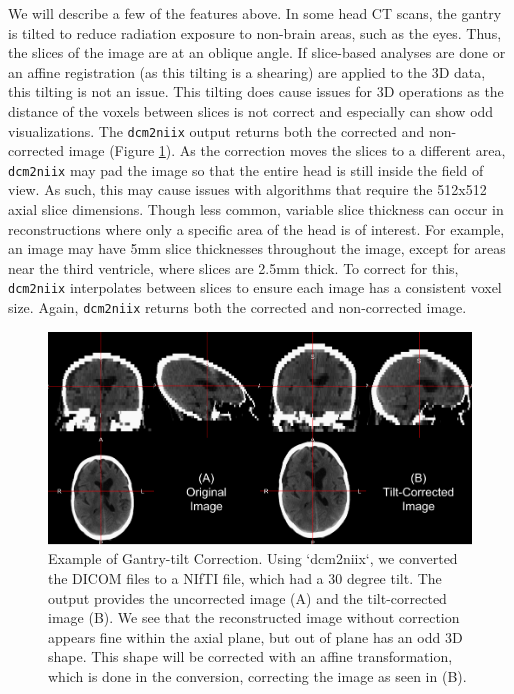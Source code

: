 \documentclass[]{elsarticle} %
\begin{document}
We will describe a few of the features above. In some head CT scans, the gantry is tilted to reduce radiation exposure to non-brain areas, such as the eyes. Thus, the slices of the image are at an oblique angle. If slice-based analyses are done or an affine registration (as this tilting is a shearing) are applied to the 3D data, this tilting is not an issue. This tilting does cause issues for 3D operations as the distance of the voxels between slices is not correct and especially can show odd visualizations. The \texttt{dcm2niix} output returns both the corrected and non-corrected image (Figure \ref{fig:gantry}). As the correction moves the slices to a different area, \texttt{dcm2niix} may pad the image so that the entire head is still inside the field of view. As such, this may cause issues with algorithms that require the 512x512 axial slice dimensions. Though less common, variable slice thickness can occur in reconstructions where only a specific area of the head is of interest. For example, an image may have 5mm slice thicknesses throughout the image, except for areas near the third ventricle, where slices are 2.5mm thick. To correct for this, \texttt{dcm2niix} interpolates between slices to ensure each image has a consistent voxel size. Again, \texttt{dcm2niix} returns both the corrected and non-corrected image.

\begin{figure}
\includegraphics[width=1\linewidth]{index_files/figure-latex/gantry-1} \caption{Example of Gantry-tilt Correction.  Using `dcm2niix`, we converted the DICOM files to a NIfTI file, which had a 30 degree tilt.  The output provides the uncorrected image (A) and the tilt-corrected image (B).  We see that the reconstructed image without correction appears fine within the axial plane, but out of plane has an odd 3D shape.  This shape will be corrected with an affine transformation, which is done in the conversion, correcting the image as seen in (B). }\label{fig:gantry}
\end{figure}
\end{document}
